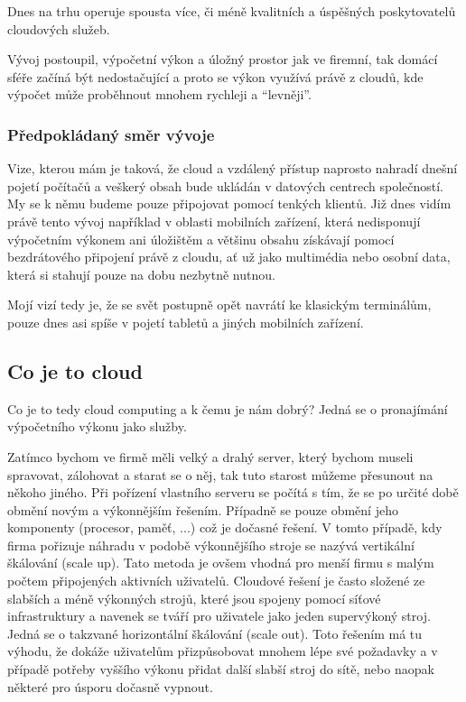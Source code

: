 Dnes na trhu operuje spousta více, či méně kvalitních a úspěšných poskytovatelů cloudových služeb.

Vývoj postoupil, výpočetní výkon a úložný prostor jak ve firemní, tak domácí sféře začíná být nedostačující a proto se výkon využívá právě z cloudů, kde výpočet může proběhnout mnohem rychleji a "`levněji"'.

\subsubsection{Předpokládaný směr vývoje}
Vize, kterou mám je taková, že cloud a vzdálený přístup naprosto nahradí dnešní pojetí počítačů a veškerý obsah bude ukládán v datových centrech společností. My se k němu budeme pouze připojovat pomocí tenkých klientů. Již dnes vidím právě tento vývoj například v oblasti mobilních zařízení, která nedisponují výpočetním výkonem ani úložištěm a většinu obsahu získávají pomocí bezdrátového připojení právě z cloudu, ať už jako multimédia nebo osobní data, která si stahují pouze na dobu nezbytně nutnou.

Mojí vizí tedy je, že se svět postupně opět navrátí ke klasickým terminálům, pouze dnes asi spíše v pojetí tabletů a jiných mobilních zařízení.

\subsection{Co je to cloud}
Co je to tedy cloud computing a k čemu je nám dobrý? Jedná se o pronajímání výpočetního výkonu jako služby.

Zatímco bychom ve firmě měli velký a drahý server, který bychom museli spravovat, zálohovat a starat se o něj, tak tuto starost můžeme přesunout na někoho jiného. Při pořízení vlastního serveru se počítá s tím, že se po určité době obmění novým a výkonnějším řešením. Případně se pouze obmění jeho komponenty (procesor, paměť, ...) což je dočasné řešení. V tomto případě, kdy firma pořizuje náhradu v podobě výkonnějšího stroje se nazývá vertikální škálování (scale up). Tato metoda je ovšem vhodná pro menší firmu s malým počtem připojených aktivních uživatelů. Cloudové řešení je často složené ze slabších a méně výkonných strojů, které jsou spojeny pomocí síťové infrastruktury a navenek se tváří pro uživatele jako jeden supervýkoný stroj. Jedná se o takzvané horizontální škálování (scale out). Toto řešením má tu výhodu, že dokáže uživatelům přizpůsobovat mnohem lépe své požadavky a v případě potřeby vyššího výkonu přidat další slabší stroj do sítě, nebo naopak některé pro úsporu dočasně vypnout.\nocite{wiki:Skalovatelnost}

